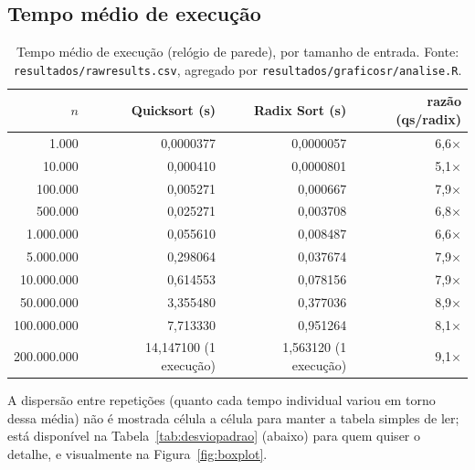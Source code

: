 \documentclass[11pt,a4paper]{article}
\newcommand{\barra}{/\allowbreak}
\renewcommand{\_}{\underscoreoriginal\allowbreak}
\begin{document}
\subsection{Tempo médio de execução}

\begin{table}[H]
\centering
\caption{Tempo médio de execução (relógio de parede), por tamanho de entrada. Fonte: \texttt{resultados\barra{}raw\_results.csv}, agregado por \texttt{resultados\barra{}graficos\_r\barra{}analise.R}.}
\label{tab:resultados}
\begin{tabular}{r r r r}
\toprule
\rowcolor{tablehead}
$n$ & Quicksort (s) & Radix Sort (s) & razão (qs/radix)\\
\midrule
1.000       & 0,0000377  & 0,0000057  & 6,6$\times$\\
10.000      & 0,000410   & 0,0000801  & 5,1$\times$\\
100.000     & 0,005271   & 0,000667   & 7,9$\times$\\
500.000     & 0,025271   & 0,003708   & 6,8$\times$\\
1.000.000   & 0,055610   & 0,008487   & 6,6$\times$\\
5.000.000   & 0,298064   & 0,037674   & 7,9$\times$\\
10.000.000  & 0,614553   & 0,078156   & 7,9$\times$\\
50.000.000  & 3,355480   & 0,377036   & 8,9$\times$\\
100.000.000 & 7,713330   & 0,951264   & 8,1$\times$\\
200.000.000 & 14,147100 (1 execução) & 1,563120 (1 execução) & 9,1$\times$\\
\bottomrule
\end{tabular}
\end{table}

A dispersão entre repetições (quanto cada tempo individual variou em
torno dessa média) não é mostrada célula a célula para manter a tabela
simples de ler; está disponível na Tabela~\ref{tab:desviopadrao}
(abaixo) para quem quiser o detalhe, e visualmente na
Figura~\ref{fig:boxplot}.
\end{document}
